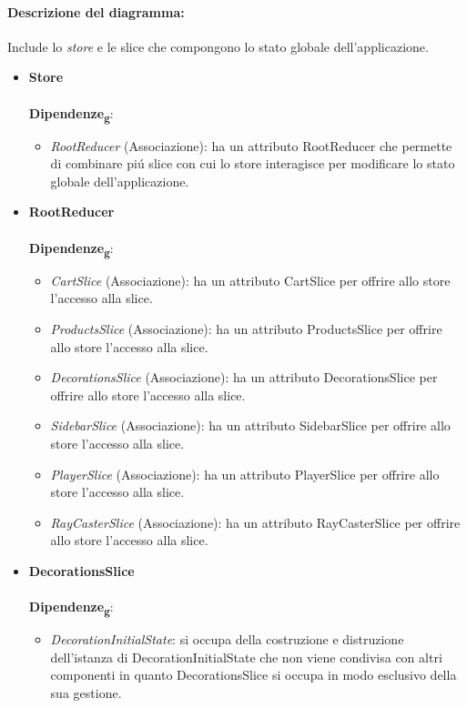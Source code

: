 \paragraph*{Descrizione del diagramma:}
Include lo \textit{store} e le slice che compongono lo stato globale dell'applicazione.
\begin{itemize}
		\item \textbf{Store}
		\\\\
		\textbf{Dipendenze\textsubscript{g}}:
		\begin{itemize}
			\item \textit{RootReducer} (Associazione): ha un attributo RootReducer che permette di combinare piú slice con cui lo store interagisce 
			per modificare lo stato globale dell'applicazione.
		\end{itemize}
		\item \textbf{RootReducer}
		\\\\
		\textbf{Dipendenze\textsubscript{g}}:
		\begin{itemize}
			\item \textit{CartSlice} (Associazione): ha un attributo CartSlice per offrire allo store l'accesso alla slice.
			\item \textit{ProductsSlice} (Associazione): ha un attributo ProductsSlice per offrire allo store l'accesso alla slice.
			\item \textit{DecorationsSlice} (Associazione): ha un attributo DecorationsSlice per offrire allo store l'accesso alla slice.
			\item \textit{SidebarSlice} (Associazione): ha un attributo SidebarSlice per offrire allo store l'accesso alla slice.
			\item \textit{PlayerSlice} (Associazione): ha un attributo PlayerSlice per offrire allo store l'accesso alla slice.
			\item \textit{RayCasterSlice} (Associazione): ha un attributo RayCasterSlice per offrire allo store l'accesso alla slice.
		\end{itemize}
		\item \textbf{DecorationsSlice}
		\\\\
		\textbf{Dipendenze\textsubscript{g}}:
		\begin{itemize}
			\item \textit{DecorationInitialState}: si occupa della costruzione e distruzione dell'istanza di DecorationInitialState
			che non viene condivisa con altri componenti in quanto DecorationsSlice si occupa in modo esclusivo della sua gestione.
		\end{itemize}


\end{itemize}
